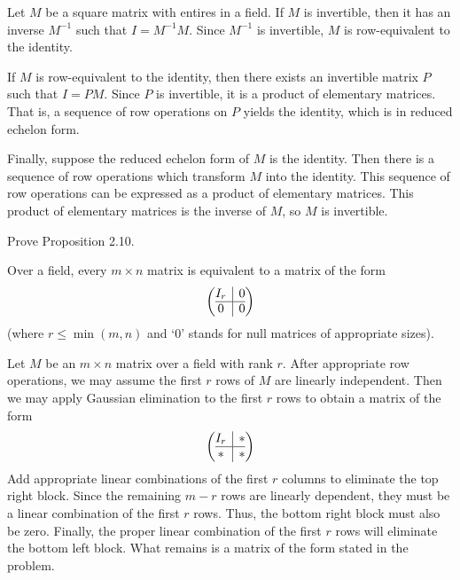 \documentclass[../../master.tex]{subfiles}
\begin{document}
\begin{solution}
    Let $M$ be a square matrix with entires in a field.
    If $M$ is invertible, then it has an inverse $M^{-1}$ such that $I = M^{-1} M$.
    Since $M^{-1}$ is invertible, $M$ is row-equivalent to the identity.

    If $M$ is row-equivalent to the identity, then there exists an invertible matrix $P$ such that $I = PM$.
    Since $P$ is invertible, it is a product of elementary matrices.
    That is, a sequence of row operations on $P$ yields the identity, which is in reduced echelon form.

    Finally, suppose the reduced echelon form of $M$ is the identity.
    Then there is a sequence of row operations which transform $M$ into the identity.
    This sequence of row operations can be expressed as a product of elementary matrices.
    This product of elementary matrices is the inverse of $M$, so $M$ is invertible.
\end{solution}

\begin{problem}
    Prove Proposition 2.10.
    \begin{proposition}[Proposition 2.10] 
        Over a field, every $m \times n$ matrix is equivalent to a matrix of the form
        \[
        \left(
            \begin{array}{@{}c|c@{}}
                I_{r} & 0 \\
                \hline
                0 & 0
            \end{array}
        \right)
        \]
        (where $r \leq \min(m, n)$ and \textup{`0'} stands for null matrices of appropriate sizes).
    \end{proposition}
\end{problem}

\begin{solution}
    Let $M$ be an $m \times n$ matrix over a field with rank $r$.
    After appropriate row operations, we may assume the first $r$ rows of $M$ are linearly independent.
    Then we may apply Gaussian elimination to the first $r$ rows to obtain a matrix of the form
    \[
        \left(
            \begin{array}{@{}c|c@{}}
                I_{r} & * \\
                \hline
                * & *
            \end{array}
        \right)
    \]
    Add appropriate linear combinations of the first $r$ columns to eliminate the top right block.
    Since the remaining $m - r$ rows are linearly dependent, they must be a linear combination of the first $r$ rows.
    Thus, the bottom right block must also be zero.
    Finally, the proper linear combination of the first $r$ rows will eliminate the bottom left block.
    What remains is a matrix of the form stated in the problem.
\end{solution}
\end{document}

